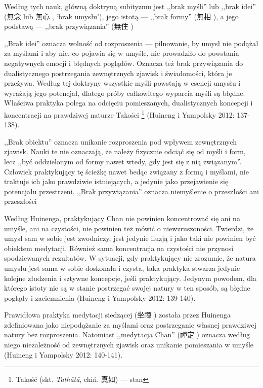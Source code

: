 Według tych nauk, główną doktryną subityzmu jest ,,brak myśli'' lub ,,brak idei'' (無念  lub 無心 , `brak umysłu'), jego istotą --- ,,brak formy'' (無相 ), a jego podstawą --- ,,brak przywiązania'' (無住 )\ibid

,,Brak idei'' oznacza wolność od rozproszenia --- pilnowanie, by umysł nie podążał za myślami i aby nic, co pojawia się w umyśle, nie prowadziło do powstania negatywnych emocji i błędnych poglądów. Oznacza też brak przywiązania do dualistycznego postrzegania zewnętrznych zjawisk i świadomości, która je przeżywa. Według tej doktryny wszystkie myśli powstają w esencji umysłu i wyrażają jego potencjał, dlatego próby całkowitego wyparcia myśli są błędne. Właściwa praktyka polega na odcięciu pomieszanych, dualistycznych koncepcji i koncentracji na prawdziwej naturze Takości%
\footnote{Takość (skt. \textit{Tathātā}, chiń. 真如) --- stan }
(Huineng i Yampolsky 2012: 137-138).

,,Brak obiektu'' oznacza unikanie rozproszenia pod wpływem zewnętrznych zjawisk. Nauki te nie oznaczają, że należy fizycznie odciąć się od myśli i form, lecz ,,być oddzielonym od formy nawet wtedy, gdy jest się z nią związanym''. Człowiek praktykujący tę ścieżkę nawet bedąc związany z formą i myślami, nie traktuje ich jako prawdziwie istniejących, a jedynie jako przejawienie się potencjału przestrzeni. ,,Brak przywiązania'' oznacza niemyślenie o przeszłości ani przeszłości\ibid

Według Huinenga, praktykujący Chan nie powinien koncentrować się ani na umyśle, ani na czystości, nie powinien też mówić o niewzruszoności. Twierdzi, że umysł sam w sobie jest zwodniczy, jest jedynie iluzją i jako taki nie powinien być obiektem medytacji. Również sama koncentracja na czystości nie przynosi spodziewanych rezultatów. W sytuacji, gdy praktykujący nie zrozumie, że natura umysłu jest sama w sobie doskonała i czysta, taka praktyka stwarza jedynie kolejne złudzenia i sztywne koncepcje, jeśli praktykujący. Jedynym powodem, dla którego istoty nie są w stanie postrzegać swojej natury w ten sposób, są błędne poglądy i zaciemnienia (Huineng i Yampolsky 2012: 139-140).

Prawidłowa praktyka medytacji siedzącej (坐禪 ) została przez Huinenga zdefiniowana jako niepodążanie za myślami oraz postrzeganie własnej prawdziwej natury bez rozproszenia. Natomiast ,,medytacja Chan'' (禪定 ) oznacza według niego niezależność od zewnętrznych zjawisk oraz unikanie pomieszania w umyśle (Huineng i Yampolsky 2012: 140-141).

